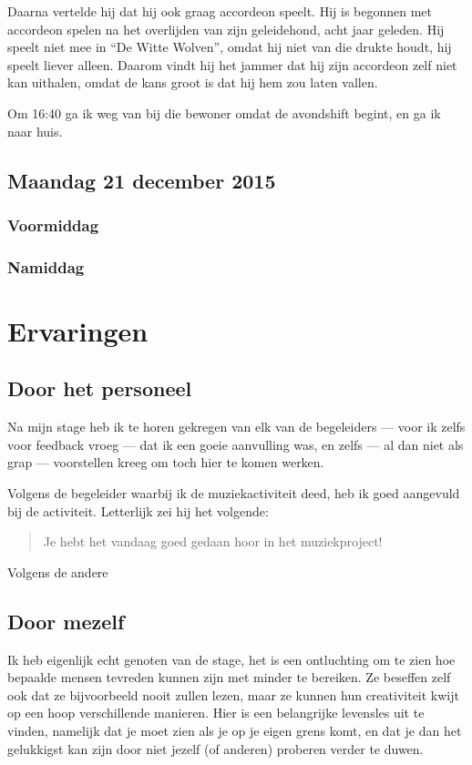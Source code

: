 \documentclass[a4paper,12pt]{article}
\begin{document}
Daarna vertelde hij dat hij ook graag accordeon speelt. Hij is begonnen met accordeon spelen na het overlijden van zijn geleidehond, acht jaar geleden. Hij speelt niet mee in ``De Witte Wolven'', omdat hij niet van die drukte houdt, hij speelt liever alleen. Daarom vindt hij het jammer dat hij zijn accordeon zelf niet kan uithalen, omdat de kans groot is dat hij hem zou laten vallen.

Om 16:40 ga ik weg van bij die bewoner omdat de avondshift begint, en ga ik naar huis.

\subsection{Maandag 21 december 2015}
\subsubsection{Voormiddag}

\subsubsection{Namiddag}

\section{Ervaringen}

\subsection{Door het personeel}
Na mijn stage heb ik te horen gekregen van elk van de begeleiders --- voor ik zelfs voor feedback vroeg --- dat ik een goeie aanvulling was, en zelfs --- al dan niet als grap --- voorstellen kreeg om toch hier te komen werken.

Volgens de begeleider waarbij ik de muziekactiviteit deed, heb ik goed aangevuld bij de activiteit. Letterlijk zei hij het volgende:

\begin{quotation}
  Je hebt het vandaag goed gedaan hoor in het muziekproject!
\end{quotation}

Volgens de andere


\subsection{Door mezelf}
Ik heb eigenlijk echt genoten van de stage, het is een ontluchting om te zien hoe bepaalde mensen tevreden kunnen zijn met minder te bereiken. Ze beseffen zelf ook dat ze bijvoorbeeld nooit zullen lezen, maar ze kunnen hun creativiteit kwijt op een hoop verschillende manieren. Hier is een belangrijke levensles uit te vinden, namelijk dat je moet zien als je op je eigen grens komt, en dat je dan het gelukkigst kan zijn door niet jezelf (of anderen) proberen verder te duwen.
\end{document}

